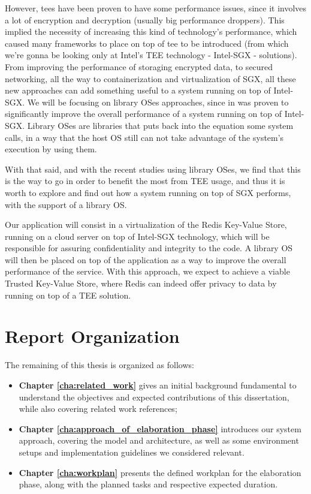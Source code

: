 However, \gls{tee}s have been proven to have some performance issues, since it involves a lot of encryption and decryption (usually big performance droppers). This implied the necessity of increasing this kind of technology’s performance, which caused many frameworks to place on top of \gls{tee} to be introduced (from which we’re gonna be looking only at Intel’s TEE technology - Intel-SGX - solutions). 
From improving the performance of storaging encrypted data, to secured networking, all the way to containerization and virtualization of SGX, all these new approaches can add something useful to a system running on top of Intel-SGX. We will be focusing on library OSes approaches, since in \cite{graphenePaper} was proven to significantly improve the overall performance of a system running on top of Intel-SGX. Library OSes are libraries that puts back into the equation some system calls, in a way that the host OS still can not take advantage of the system’s execution by using them.

With that said, and with the recent studies using library OSes, we find that this is the way to go in order to benefit the most from TEE usage, and thus it is worth to explore and find out how a system running on top of SGX performs, with the support of a library OS.

Our application will consist in a virtualization of the Redis Key-Value Store, running on a cloud server on top of Intel-SGX technology, which will be responsible for assuring confidentiality and integrity to the code. 
A library OS will then be placed on top of the application as a way to improve the overall performance of the service. With this approach, we expect to achieve a viable Trusted Key-Value Store, where Redis can indeed offer privacy to data by running on top of a TEE solution.




\section{Report Organization}

The remaining of this thesis is organized as follows:
\begin{itemize}
	\item \textbf{Chapter \ref{cha:related_work}} gives an initial background fundamental to understand the objectives and expected contributions of this dissertation, while also covering related work references; 
	\item \textbf{Chapter \ref{cha:approach_of_elaboration_phase}} introduces our system approach, covering the model and architecture, as well as some environment setups and implementation guidelines we considered relevant.
	\item \textbf{Chapter \ref{cha:workplan}} presents the defined workplan for the elaboration phase, along with the planned tasks and respective expected duration.
\end{itemize}
